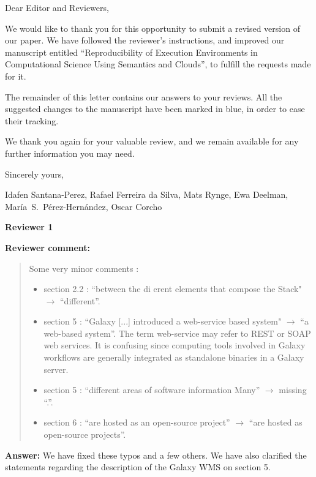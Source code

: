 \documentclass{letter}
\date{Nov 30, 2015}
\newenvironment{review}%
{\textbf{Reviewer comment:}\begin{quote}}%
{\end{quote}}%
\newcommand{\answer}[1]{%
      \textbf{Answer:} #1}
\begin{document}
\begin{letter}{}

\opening{Dear Editor and Reviewers,}

We would like to thank you for this opportunity to submit a revised version of our paper. We have followed the reviewer's instructions, and improved our manuscript entitled ``Reproducibility of Execution Environments in Computational Science Using Semantics and Clouds'', to fulfill the requests made for it. 

The remainder of this letter contains our answers to your reviews. All the suggested changes to the manuscript have been marked in blue, in order to ease their tracking.

We thank you again for your valuable review, and we remain available for any further information you may need.

\vspace{0.5cm}

Sincerely yours,

\vspace{1cm}

Idafen Santana-Perez, Rafael Ferreira da Silva, Mats Rynge, Ewa Deelman, Mar\'ia~S.~P\'erez-Hern\'andez, Oscar Corcho

\newpage


%
%
\textbf{Reviewer 1}

\begin{review}
Some very minor comments :
\begin{itemize}
        \item section 2.2 : ``between the di  erent elements that compose the Stack" $\rightarrow$ ``different''.
        \item section 5 : ``Galaxy [...] introduced a web-service based system" $\rightarrow$ ``a web-based system''. The term web-service may refer to REST or SOAP web services. It is confusing since computing tools involved in Galaxy workflows are generally integrated as standalone binaries in a Galaxy server.
        \item section 5 : ``different areas of software information Many'' $\rightarrow$ missing ``.''.
        \item section 6 : ``are hosted as an open-source project'' $\rightarrow$ ``are hosted as open-source projects''.
        \end{itemize}
\end{review}

\answer{We have fixed these typos and a few others. We have also clarified the statements regarding the description of the Galaxy WMS on section 5.}


\end{letter}
\end{document}
